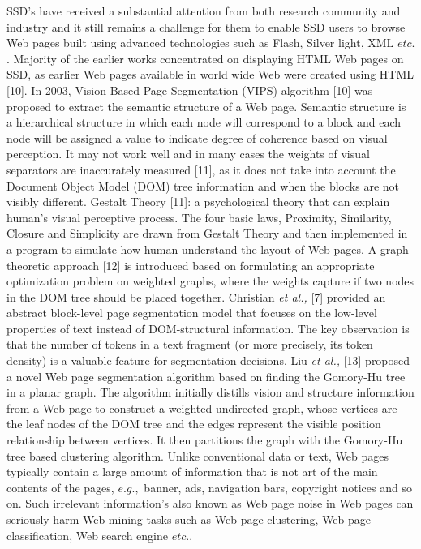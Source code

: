 \documentclass[fleqn,twoside]{article}
\begin{document}
SSD's have received a substantial attention from both research community and industry and it still remains a challenge for them to enable SSD users to browse Web pages built using advanced technologies such as Flash, Silver light, XML $etc.$.  Majority of the earlier works concentrated on displaying HTML Web pages on SSD, as earlier Web pages available in world wide Web were created using HTML [10].   
\vskip 2mm
In 2003, Vision Based Page Segmentation (VIPS) algorithm [10] was proposed to extract the semantic structure of a Web page. Semantic structure is a hierarchical structure in which each node will correspond to a block and each node will be assigned a value to indicate degree of coherence based on visual perception. It may not work well and in many cases the weights of visual separators are inaccurately measured [11],   as it does not take into account the Document Object Model (DOM) tree information and when the blocks are not visibly different. Gestalt Theory [11]: a psychological theory that can explain human's visual perceptive process. The four basic laws, Proximity, Similarity, Closure and Simplicity are drawn from Gestalt Theory and then implemented in a program to simulate how human understand the layout of Web pages. 
\vskip 2mm
A graph-theoretic approach [12] is introduced based on formulating an appropriate optimization problem on weighted graphs, where the weights capture if two nodes in the DOM tree should be placed together. Christian {\it et al.,} [7] provided an abstract block-level page segmentation model that focuses on the low-level properties of text instead of DOM-structural information. The key observation is that the number of tokens in a text fragment (or more precisely, its token density) is a valuable feature for segmentation decisions. Liu {\it et al.,} [13] proposed a novel Web page segmentation algorithm based on finding the Gomory-Hu tree in a planar graph. The algorithm initially distills vision and structure information from a Web page to construct a weighted undirected graph, whose vertices are the leaf nodes of the DOM tree and the edges represent the visible position relationship between vertices.  It then partitions the graph with the Gomory-Hu tree based clustering algorithm. 
\vskip 2mm
Unlike conventional data or text, Web pages typically contain a large amount of information that is not art of the main contents of the pages, $e.g.,$ banner, ads, navigation bars, copyright notices and so on. Such irrelevant information's also known as Web page noise in Web pages can seriously harm Web mining tasks such as Web page clustering, Web page classification, Web search engine $etc.$.
\end{document}
